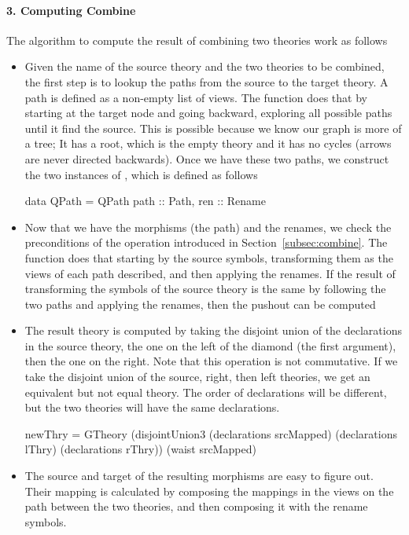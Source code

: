 \paragraph{3. Computing Combine}
The algorithm to compute the result of combining two theories work as follows 
\begin{itemize}
    \item Given the name of the source theory and the two theories to be combined, the first step is to lookup the paths from the source to the target theory. A path is defined as a non-empty list of views. The function  does that by starting at the target node and going backward, exploring all possible paths until it find the source. This is possible because we know our graph is more of a tree; It has a root, which is the empty theory and it has no cycles (arrows are never directed backwards). Once we have these two paths, we construct the two instances of , which is defined as follows 
\begin{hscode}
data QPath = QPath { 
  path :: Path,
  ren  :: Rename }
\end{hscode}

    \item Now that we have the morphisms (the path) and the renames, we check the preconditions of the operation introduced in Section~\ref{subsec:combine}. The function  does that starting by the source symbols, transforming them as the views of each path described, and then applying the renames. If the result of transforming the symbols of the source theory is the same by following the two paths and applying the renames, then the pushout can be computed 
    
    \item The result theory is computed by taking the disjoint union of the declarations in the source theory, the one on the left of the diamond (the first argument), then the one on the right. Note that this operation is not commutative. If we take the disjoint union of the source, right, then left theories, we get an equivalent but not equal theory. The order of declarations will be different, but the two theories will have the same declarations. 
\begin{hscode}
 newThry = 
   GTheory (disjointUnion3 (declarations srcMapped)
                           (declarations lThry) 
                           (declarations rThry)) 
           (waist srcMapped)
\end{hscode}    
    \item The source and target of the resulting morphisms are easy to figure out. Their mapping is calculated by composing the mappings in the views on the path between the two theories, and then composing it with the rename symbols. 
\end{itemize}

